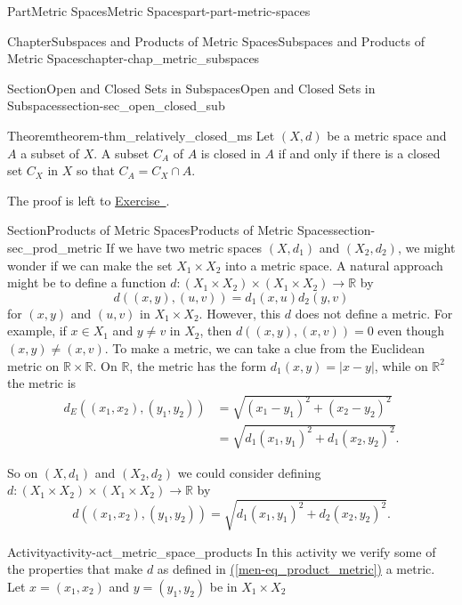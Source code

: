 \documentclass[oneside,10pt,]{book}
\newcommand{\xreffont}{\relax}
\numberwithin{equation}{chapter}
\newcommand{\R}{\mathbb{R}}
\newcommand{\amp}{&}
\begin{document}
\begin{partptx}{Part}{Metric Spaces}{}{Metric Spaces}{}{}{part-part-metric-spaces}
\begin{chapterptx}{Chapter}{Subspaces and Products of Metric Spaces}{}{Subspaces and Products of Metric Spaces}{}{}{chapter-chap_metric_subspaces}
\begin{sectionptx}{Section}{Open and Closed Sets in Subspaces}{}{Open and Closed Sets in Subspaces}{}{}{section-sec_open_closed_sub}
\begin{theorem}{Theorem}{}{}{theorem-thm_relatively_closed_ms}%
Let \((X,d)\) be a metric space and \(A\) a subset of \(X\). A subset \(C_A\) of \(A\) is closed in \(A\) if and only if there is a closed set \(C_X\) in \(X\) so that \(C_A = C_X \cap A\).%
\end{theorem}
The proof is left to \hyperlink{exercise-ex_relatively_closed_ms}{Exercise~{\xreffont 4}}.%
\end{sectionptx}
%
%
\typeout{************************************************}
\typeout{************************************************}
%
\begin{sectionptx}{Section}{Products of Metric Spaces}{}{Products of Metric Spaces}{}{}{section-sec_prod_metric}
If we have two metric spaces \((X, d_1)\) and \((X_2 ,d_2)\), we might wonder if we can make the set \(X_1 \times X_2\) into a metric space. A natural approach might be to define a function \(d : (X_1 \times X_2) \times (X_1 \times X_2) \to \R\) by%
\begin{equation*}
d((x,y),(u,v)) = d_1(x,u)d_2(y,v)
\end{equation*}
for \((x,y)\) and \((u,v)\) in \(X_1 \times X_2\). However, this \(d\) does not define a metric. For example, if \(x \in X_1\) and \(y \neq v\) in \(X_2\), then \(d((x,y),(x,v)) = 0\) even though \((x,y) \neq (x,v)\). To make a metric, we can take a clue from the Euclidean metric on \(\R \times \R\). On \(\R\), the metric has the form \(d_1(x,y) = |x-y|\), while on \(\R^2\) the metric  is%
\begin{align*}
d_E((x_1,x_2), (y_1,y_2)) \amp = \sqrt{ (x_1-y_1)^2 + (x_2-y_2)^2}\\
\amp = \sqrt{d_1(x_1,y_1)^2 + d_1(x_2,y_2)^2}\text{.}
\end{align*}
%
\par
So on \((X, d_1)\) and \((X_2 ,d_2)\) we could consider defining \(d : (X_1 \times X_2) \times (X_1 \times X_2) \to \R\) by%
\begin{equation}
d((x_1,x_2), (y_1,y_2)) = \sqrt{ d_1(x_1,y_1)^2 + d_2(x_2,y_2)^2}\text{.}\label{men-eq_product_metric}
\end{equation}
%
\begin{activity}{Activity}{}{activity-act_metric_space_products}%
In this activity we verify some of the properties that make \(d\) as defined in \hyperref[men-eq_product_metric]{({\xreffont\ref{men-eq_product_metric}})} a metric. Let \(x=(x_1,x_2)\) and \(y=(y_1,y_2)\) be in \(X_1 \times X_2\)%

\end{activity}
\end{sectionptx}
\end{chapterptx}
\end{partptx}
\end{document}
